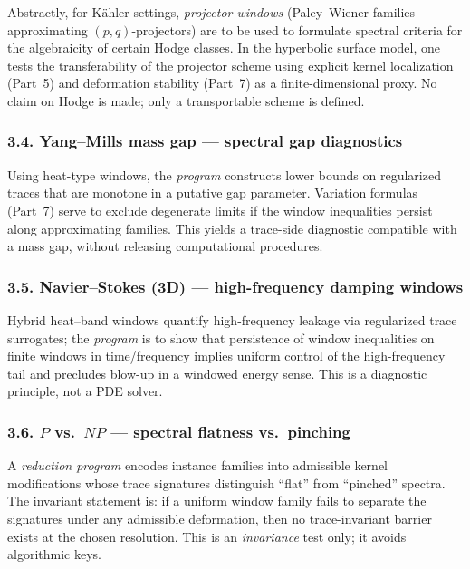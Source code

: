 Abstractly, for K\"ahler settings, \emph{projector windows} (Paley--Wiener families approximating $(p,q)$-projectors) are to be used to formulate spectral criteria for the algebraicity of certain Hodge classes. In the hyperbolic surface model, one tests the transferability of the projector scheme using explicit kernel localization (Part~5) and deformation stability (Part~7) as a finite-dimensional proxy. No claim on Hodge is made; only a transportable scheme is defined. \relax\hspace{0pt}

\subsubsection*{3.4. Yang--Mills mass gap — spectral gap diagnostics}\relax\hspace{0pt}
\label{subsubsec:tfc8-YM} %

Using heat-type windows, the \emph{program} constructs lower bounds on regularized traces that are monotone in a putative gap parameter. Variation formulas (Part~7) serve to exclude degenerate limits if the window inequalities persist along approximating families. This yields a trace-side diagnostic compatible with a mass gap, without releasing computational procedures. \relax\hspace{0pt}

\subsubsection*{3.5. Navier--Stokes (3D) — high-frequency damping windows}\relax\hspace{0pt}
\label{subsubsec:tfc8-NS} %

Hybrid heat--band windows quantify high-frequency leakage via regularized trace surrogates; the \emph{program} is to show that persistence of window inequalities on finite windows in time/frequency implies uniform control of the high-frequency tail and precludes blow-up in a windowed energy sense. This is a diagnostic principle, not a PDE solver. \relax\hspace{0pt}

\subsubsection*{3.6. $P$ vs.\ $NP$ — spectral flatness vs.\ pinching}\relax\hspace{0pt}
\label{subsubsec:tfc8-PNP} %

A \emph{reduction program} encodes instance families into admissible kernel modifications whose trace signatures distinguish ``flat'' from ``pinched'' spectra. The invariant statement is: if a uniform window family fails to separate the signatures under any admissible deformation, then no trace-invariant barrier exists at the chosen resolution. This is an \emph{invariance} test only; it avoids algorithmic keys. \relax\space{-1pt}

